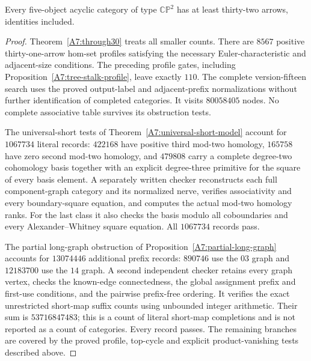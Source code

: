 \begin{theorem}
\label{A7:through31}
Every five-object acyclic category of type $\mathbb{CP}^2$ has
at least thirty-two arrows, identities included.
\end{theorem}
\begin{proof}
Theorem~\ref{A7:through30} treats all smaller counts. There are
$8567$ positive thirty-one-arrow hom-set profiles satisfying the
necessary Euler-characteristic and adjacent-size conditions.
The preceding profile gates, including
Proposition~\ref{A7:tree-stalk-profile}, leave exactly $110$.
The complete version-fifteen search uses the proved output-label
and adjacent-prefix normalizations without further identification
of completed categories. It visits $80058405$ nodes. No complete
associative table survives its obstruction tests.

The universal-short tests of
Theorem~\ref{A7:universal-short-model} account for $1067734$
literal records: $422168$ have positive third mod-two homology,
$165758$ have zero second mod-two homology, and $479808$ carry a
complete degree-two cohomology basis together with an explicit
degree-three primitive for the square of every basis element.
A separately written checker reconstructs each full component-graph
category and its normalized nerve, verifies associativity and
every boundary-square equation, and computes the actual mod-two
homology ranks. For the last class it also checks the basis modulo
all coboundaries and every Alexander--Whitney square equation.
All $1067734$ records pass.

The partial long-graph obstruction of
Proposition~\ref{A7:partial-long-graph} accounts for $13074446$
additional prefix records: $890746$ use the $03$ graph and
$12183700$ use the $14$ graph. A second independent checker
retains every graph vertex, checks the known-edge connectedness,
the global assignment prefix and first-use conditions, and the
pairwise prefix-free ordering. It verifies the exact unrestricted
short-map suffix counts using unbounded integer arithmetic. Their
sum is $53716847483$; this is a count of literal short-map
completions and is not reported as a count of categories. Every
record passes. The remaining branches are covered by the proved
profile, top-cycle and explicit product-vanishing tests described
above.


\end{proof}
